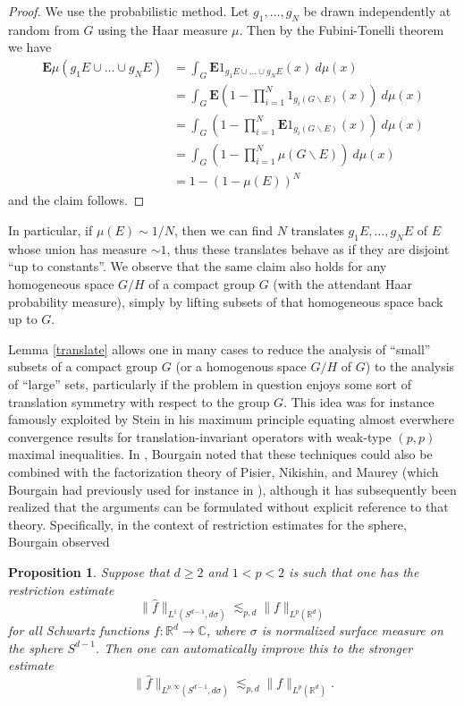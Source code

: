 \documentclass[12pt,a4paper,reqno]{amsart}
\numberwithin{equation}{section}
\theoremstyle{plain}
\newtheorem{proposition}[theorem]{Proposition}
\theoremstyle{definition}
\newcommand\R{\mathbb{R}}
\newcommand\C{\mathbb{C}}
\begin{document}
\begin{proof}  We use the probabilistic method. Let $g_1,\dots,g_N$ be drawn independently at random from $G$ using the Haar measure $\mu$.  Then by the Fubini-Tonelli theorem we have
\begin{align*}
 {\mathbf E} \mu( g_1 E \cup \dots \cup g_N E ) &= \int_G {\mathbf E} 1_{g_1 E \cup \dots \cup g_N E}(x)\ d\mu(x) \\
&= \int_G {\mathbf E} (1 - \prod_{i=1}^N 1_{g_i (G \backslash E)}(x))\ d\mu(x) \\
&= \int_G (1 - \prod_{i=1}^N {\mathbf E} 1_{g_i (G \backslash E)}(x))\ d\mu(x) \\
&= \int_G (1 - \prod_{i=1}^N \mu(G \backslash E))\ d\mu(x) \\
&= 1 - (1-\mu(E))^N
\end{align*}
and the claim follows.
\end{proof}

In particular, if $\mu(E) \sim 1/N$, then we can find $N$ translates $g_1 E, \dots, g_N E$ of $E$ whose union has measure $\sim 1$, thus these translates behave as if they are disjoint ``up to constants''.  We observe that the same claim also holds for any homogeneous space $G/H$ of a compact group $G$ (with the attendant Haar probability measure), simply by lifting subsets of that homogeneous space back up to $G$.

Lemma \ref{translate} allows one in many cases to reduce the analysis of ``small'' subsets of a compact group $G$ (or a homogenous space $G/H$ of $G$) to the analysis of ``large'' sets, particularly if the problem in question enjoys some sort of translation symmetry with respect to the group $G$.  This idea was for instance famously exploited by Stein \cite{stein} in his maximum principle equating almost everwhere convergence results for translation-invariant operators with weak-type $(p,p)$ maximal inequalities.  In \cite[\S 6]{besicovitch}, Bourgain noted that these techniques could also be combined with the factorization theory of Pisier, Nikishin, and Maurey \cite{pisier} (which Bourgain had previously used for instance in \cite{zonotopes}), although it has subsequently been realized that the arguments can be formulated without explicit reference to that theory.  Specifically, in the context of restriction estimates for the sphere, Bourgain observed

\begin{proposition}  Suppose that $d \geq 2$ and $1 < p < 2$ is such that one has the restriction estimate
\begin{equation}\label{don}
 \| \hat f \|_{L^1(S^{d-1}, d\sigma)} \lesssim_{p,d} \|f\|_{L^p(\R^d)}
\end{equation}
for all Schwartz functions $f \colon \R^d \to \C$, where $\sigma$ is normalized surface measure on the sphere $S^{d-1}$.  Then one can automatically improve this to the stronger estimate
$$ \| \hat f \|_{L^{p,\infty}(S^{d-1}, d\sigma)} \lesssim_{p,d} \|f\|_{L^p(\R^d)}.$$
\end{proposition}
\end{document}
